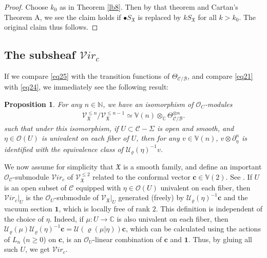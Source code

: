 \documentclass[12pt,a4paper,notitlepage]{article}
\theoremstyle{definition}
\theoremstyle{plain}
\newtheorem{pp}[df]{Proposition}
\newcommand{\fk}{\mathfrak}
\newcommand{\mc}{\mathcal}
\newcommand{\id}{\mathbf{1}}
\newcommand{\scr}{\mathscr}
\newcommand{\SX}{S_{\fk X}}
\newcommand{\blt}{\bullet}
\newcommand{\Vbb}{\mathbb V}
\newcommand{\Cbb}{\mathbb C}
\newcommand{\Nbb}{\mathbb N}
\newcommand{\cbf}{\mathbf c}
\newcommand{\svir}{\mathcal V\!\mathit{ir}}
\numberwithin{equation}{section}
\begin{document}
\begin{proof}
Choose $k_0$ as in Theorem \ref{lb8}. Then by that theorem  and Cartan's Theorem A, we see the claim holds if $\blt\SX$ is replaced by $k\SX$ for all $k>k_0$. The original claim thus follows.
\end{proof}







\subsection*{The subsheaf $\svir_c$}

If we compare \eqref{eq25} with the transition functions of $\Theta_{\mc C/\mc B}$, and  compare \eqref{eq21} with \eqref{eq24}, we immediately see the following result:

\begin{pp}\label{lb12}
For any $n\in\Nbb$, we have an isomorphism of  $\scr O_C$-modules
	\begin{align}
	\scr V_{\fk X}^{\leq n}/\scr V_{\fk X}^{\leq n-1}\simeq\Vbb(n)\otimes_{\Cbb}\Theta_{\mc C/\mc B}^{\otimes n}.
	\end{align}
such that under this isomorphism, if $U\subset \mc C-\Sigma$ is open and smooth, and $\eta\in\scr O(U)$ is univalent on each fiber of $U$, then for any $v\in\Vbb(n)$, $v\otimes \partial_\eta^n$ is identified with the equivalence class of $\mc U_\varrho(\eta)^{-1}v$.
\end{pp}

We now assume for simplicity that $\fk X$ is a smooth family, and define an important $\scr O_{\mc C}$-submodule $\svir_c$ \index{Virc@$\svir_c$} of $\scr V_{\fk X}^{\leq 2}$ related to the conformal vector $\cbf\in\Vbb(2)$. See \cite[Sec. 8.2]{FB04}. If $U$ is an open subset of $\mc C$ equipped with  $\eta\in\scr O(U)$ univalent on each fiber, then $\svir_c|_U$ is the  $\scr O_U$-submodule of $\scr V_{\fk X}|_U$ generated (freely) by $\mc U_\varrho(\eta)^{-1}\cbf$ and the vacuum section $\id$, which is locally free of rank $2$. This definition is independent of the choice of $\eta$. Indeed, if $\mu:U\rightarrow\Cbb$ is also univalent on each fiber, then $\mc U_\varrho(\mu)\mc U_\varrho(\eta)^{-1}\cbf=\mc U(\varrho(\mu|\eta))\cbf$, which can be calculated using the actions of $L_n$ ($n\geq 0$) on $\cbf$, is an $\scr O_U$-linear combination of $\cbf$ and $\id$. Thus, by gluing all such $U$, we get $\svir_c$.
\end{document}
